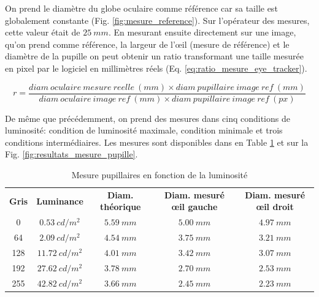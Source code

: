 	\par On prend le diamètre du globe oculaire comme référence car sa taille est globalement constante (Fig. \ref{fig:mesure_reference}). Sur l'opérateur des mesures, cette valeur était de $25~mm$. En mesurant ensuite directement sur une image, qu'on prend comme référence, la largeur de l'œil (mesure de référence) et le diamètre de la pupille on peut obtenir un ratio transformant une taille mesurée en pixel par le logiciel en millimètres réels (Eq. \ref{eq:ratio_mesure_eye_tracker}).
	
	\begin{equation}
		r = \frac{diam~oculaire~mesure~reelle~(mm) \times diam~pupillaire~image~ref~(mm)}{diam~oculaire~image~ref~(mm) \times diam~pupillaire~image~ref~(px)}
		\label{eq:ratio_mesure_eye_tracker}
	\end{equation}
	
	\par De même que précédemment, on prend des mesures	dans cinq conditions de luminosité: condition de luminosité maximale, condition minimale et trois conditions intermédiaires. Les mesures sont disponibles dans en Table \ref{tab:mesure_pupillaire} et sur la Fig. \ref{fig:resultats_mesure_pupille}.
	
	\begin{table}[h]	
		\centering
		\caption{Mesure pupillaires en fonction de la luminosité}
		\label{tab:mesure_pupillaire}
		\small
		\begin{tabular}{ccccc}
			\textbf{Gris} & \textbf{Luminance} & \textbf{Diam. théorique} & \textbf{Diam. mesuré œil gauche} & \textbf{Diam. mesuré œil droit}\\
			0 & $0.53~cd/m^2$ & $5.59~mm$ & $5.00~mm$ & $4.97~mm$\\
			64 & $2.09~cd/m^2$ & $4.54~mm$ & $3.75~mm$ & $3.21~mm$\\
			128 & $11.72~cd/m^2$ & $4.01~mm$ & $3.42~mm$ & $3.07~mm$\\
			192 & $27.62~cd/m^2$ & $3.78~mm$ & $2.70~mm$ & $2.53~mm$\\
			255 & $42.82~cd/m^2$ & $3.66~mm$ & $2.45~mm$ & $2.23~mm$\\
		\end{tabular}
	\end{table}
	
